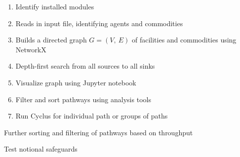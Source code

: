 \begin{frame}{\Trailmap}

    \begin{enumerate}
        \item Identify installed \Cyclus modules
        \item Reads in \Cyclus input file, identifying agents and commodities
        \item Builds a directed graph $G = (V, \ E)$ of facilities and commodities using NetworkX
        \item Depth-first search from all sources to all sinks
        \item Visualize graph using Jupyter notebook
        \item Filter and sort pathways using analysis tools
        \item Run Cyclus for individual path or groups of paths
    \end{enumerate}
    \begin{enumerate}
        \setcounter{enumi}{6}
        {\color{gray}
        \item Further sorting and filtering of pathways based on throughput
        \item Test notional safeguards}
    \end{enumerate}
\end{frame}


